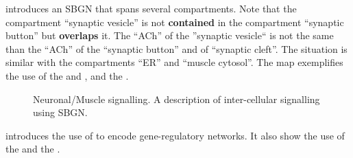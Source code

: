 introduces an SBGN \PD that spans several compartments. Note that the compartment ``synaptic vesicle'' is not \textbf{contained} in the compartment ``synaptic button'' but \textbf{overlaps} it. The  ``ACh'' of the ''synaptic vesicle`` is not the same  than the ``ACh'' of the ``synaptic button'' and of ``synaptic cleft''.  The situation is similar with the compartments ``ER'' and ``muscle cytosol''.  The map exemplifies the use of the   and , and the  .

\begin{figure}[htb]
\begin{center}
\caption{Neuronal/Muscle signalling. A description of inter-cellular signalling using SBGN.}\label{fig:muscle}
\end{center}
\end{figure}

 introduces the use of \SBGNPDLone to encode gene-regulatory networks. It also show the use of the   and the  .

